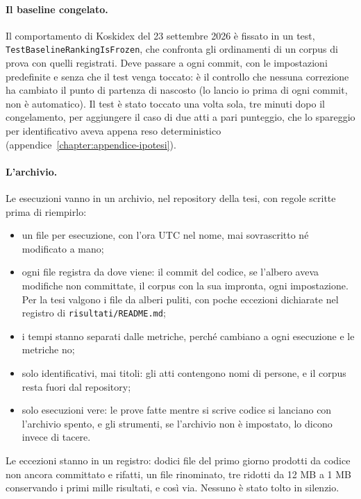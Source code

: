 \paragraph{Il baseline congelato.} Il comportamento di Koskidex del 23 settembre
2026 è fissato in un test, \texttt{TestBaselineRankingIsFrozen}, che confronta gli
ordinamenti di un corpus di prova con quelli registrati. Deve passare a ogni
commit, con le impostazioni predefinite e senza che il test venga toccato: è il
controllo che nessuna correzione ha cambiato il punto di partenza di nascosto
(lo lancio io prima di ogni commit, non è automatico). Il
test è stato toccato una volta sola, tre minuti dopo il congelamento, per
aggiungere il caso di due atti a pari punteggio, che lo spareggio per
identificativo aveva appena reso deterministico (appendice~\ref{chapter:appendice-ipotesi}).

\paragraph{L'archivio.} Le esecuzioni vanno in un archivio, nel repository della
tesi, con regole scritte prima di riempirlo:
\begin{itemize}
  \item un file per esecuzione, con l'ora UTC nel nome, mai sovrascritto né
        modificato a mano;
  \item ogni file registra da dove viene: il commit del codice, se l'albero aveva
        modifiche non committate, il corpus con la sua impronta, ogni
        impostazione. Per la tesi valgono i file da alberi puliti, con poche eccezioni dichiarate nel
        registro di \texttt{risultati/README.md};
  \item i tempi stanno separati dalle metriche, perché cambiano a ogni esecuzione
        e le metriche no;
  \item solo identificativi, mai titoli: gli atti contengono nomi di persone, e
        il corpus resta fuori dal repository;
  \item solo esecuzioni vere: le prove fatte mentre si scrive codice si lanciano
        con l'archivio spento, e gli strumenti, se l'archivio non è impostato,
        lo dicono invece di tacere.
\end{itemize}
Le eccezioni stanno in un registro: dodici file del primo giorno prodotti da
codice non ancora committato e rifatti, un file rinominato, tre ridotti da 12 MB a
1 MB conservando i primi mille risultati, e così via. Nessuno è stato tolto in
silenzio.

